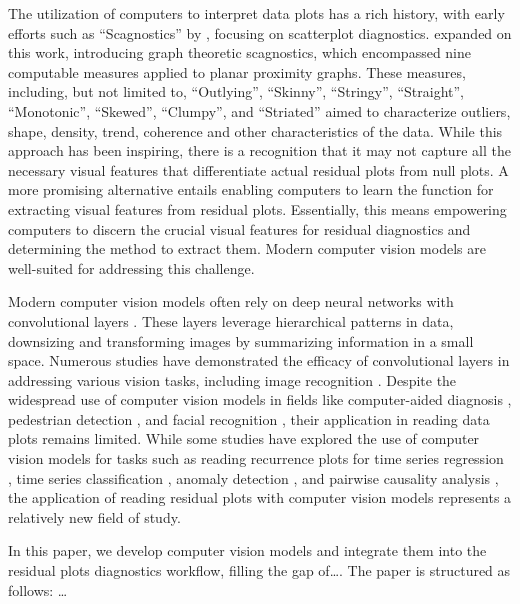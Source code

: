 \documentclass[]{interact}
\theoremstyle{plain}%
\theoremstyle{definition}
\theoremstyle{remark}
\begin{document}
The utilization of computers to interpret data plots has a rich history,
with early efforts such as ``Scagnostics'' by \citet{tukey1985computer},
focusing on scatterplot diagnostics. \citet{wilkinson2005graph} expanded
on this work, introducing graph theoretic scagnostics, which encompassed
nine computable measures applied to planar proximity graphs. These
measures, including, but not limited to, ``Outlying'', ``Skinny'',
``Stringy'', ``Straight'', ``Monotonic'', ``Skewed'', ``Clumpy'', and
``Striated'' aimed to characterize outliers, shape, density, trend,
coherence and other characteristics of the data. While this approach has
been inspiring, there is a recognition \citep{buja2009statistical} that
it may not capture all the necessary visual features that differentiate
actual residual plots from null plots. A more promising alternative
entails enabling computers to learn the function for extracting visual
features from residual plots. Essentially, this means empowering
computers to discern the crucial visual features for residual
diagnostics and determining the method to extract them. Modern computer
vision models are well-suited for addressing this challenge.

Modern computer vision models often rely on deep neural networks with
convolutional layers \citep{fukushima1982neocognitron}. These layers
leverage hierarchical patterns in data, downsizing and transforming
images by summarizing information in a small space. Numerous studies
have demonstrated the efficacy of convolutional layers in addressing
various vision tasks, including image recognition \citep{rawat2017deep}.
Despite the widespread use of computer vision models in fields like
computer-aided diagnosis \citep{lee2015image}, pedestrian detection
\citep{brunetti2018computer}, and facial recognition
\citep{emami2012facial}, their application in reading data plots remains
limited. While some studies have explored the use of computer vision
models for tasks such as reading recurrence plots for time series
regression \citep{ojeda2020multivariate}, time series classification
\citep{chu2019automatic, hailesilassie2019financial, hatami2018classification, zhang2020encoding},
anomaly detection \citep{chen2020convolutional}, and pairwise causality
analysis \citep{singh2017deep}, the application of reading residual
plots with computer vision models represents a relatively new field of
study.

In this paper, we develop computer vision models and integrate them into
the residual plots diagnostics workflow, filling the gap of\ldots. The
paper is structured as follows: \ldots{}
\end{document}
